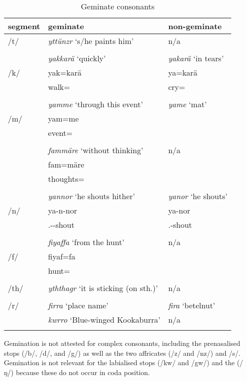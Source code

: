 \begin{table}
\caption{Geminate consonants}
\label{geminates}
	\begin{tabular}{lll}
		\lsptoprule
		{segment} & {geminate} & {non-geminate} \\ \midrule
		/t/ & \emph{yttünzr} `s/he paints him' & n/a \\
		&&\\
		& \emph{yakkarä} `quickly' & \emph{yakarä} `in tears'\\
		/k/ & yak=karä & ya=karä \\
		& walk=\Prop{} & cry=\Prop{}\\
		&&\\
		& \emph{yamme} `through this event' & \emph{yame} `mat' \\
		/m/ & yam=me & \\
		& event=\Ins{} & \\
		&&\\
		& \emph{fammäre} `without thinking' & n/a \\
 	   	& fam=märe & \\
 	   	& thoughts=\Priv{} & \\
		&&\\
		& \emph{yannor} `he shouts hither' & \emph{yanor} `he shouts'\\
		/n/ & ya-n-nor & ya-nor \\
		& \Tsg{}.\Masc{}-\Venit{}-shout & \Tsg{}.\Masc{}-shout\\
		&&\\
 	   	& \emph{fiyaffa} `from the hunt' & n/a \\
		/f/ & fiyaf=fa & \\
		& hunt=\Abl{} & \\
		&&\\
		/th/ & \emph{yththagr} `it is sticking (on sth.)' 	& n/a \\
		&&\\
		/r/ & \emph{firra} `place name' & \emph{fira} `betelnut'\\
		& \emph{kwrro} `Blue-winged Kookaburra' & n/a \\
		\lspbottomrule
	\end{tabular}
\end{table}%

Gemination is not attested for complex consonants, including the prenasalised stops (/b/, /d/, and /g/) as well as the two affricates (/z/ and /nz/) and /s/. Gemination is not relevant for the labialised  stops (/kw/ and /gw/) and the   (/ŋ/) because these do not occur in coda position.

